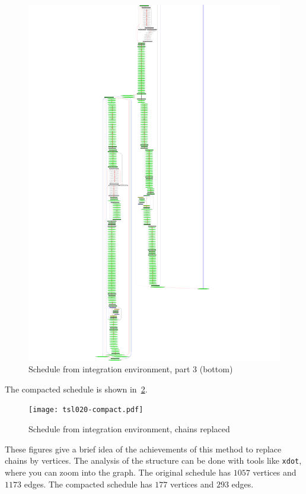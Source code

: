 \documentclass[12pt,a4paper]{report}
\begin{document}
    \begin{figure}
        \centering
        \includegraphics*[width=1.0\textwidth,keepaspectratio]{tsl020-3.pdf}
        \caption{Schedule from integration environment, part 3 (bottom)}
        \label{fig:tsl020-3}
    \end{figure}
The compacted schedule is shown in~\ref{fig:tsl020-compact}.
    \begin{figure}
        \centering
        \texttt{[image: tsl020-compact.pdf]}
        \caption{Schedule from integration environment, chains replaced}
        \label{fig:tsl020-compact}
    \end{figure}
These figures give a brief idea of the achievements of this method to
replace chains by vertices. The analysis of the structure can be done
with tools like \texttt{xdot}, where you can zoom into the graph. The original
schedule has $1057$ vertices and $1173$ edges. The compacted schedule
has $177$ vertices and $293$ edges.
\end{document}
